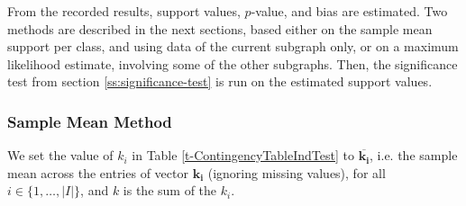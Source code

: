 \documentclass{sig-alternate}
\begin{document}
From the recorded results, support values, $p$-value, 
and bias are estimated. Two methods are described in the next sections, based either
on the sample mean support per class, and using data of the current subgraph
only, or on a maximum likelihood estimate, involving some of the other
subgraphs. Then, the significance test from section \ref{ss:significance-test}
is run on the estimated support values. 

\subsubsection{Sample Mean Method}
\label{ss:simple-mean}
We set the value of $k_i$ in Table \ref{t-ContingencyTableIndTest} to
$\overline{\mathbf{k_i}}$, i.e. the sample mean
across the entries of vector $\mathbf{k_i}$ (ignoring missing values), for all $i \in \{1,\ldots,|I|\}$,
and $k$ is the sum of the $k_i$.
\end{document}
